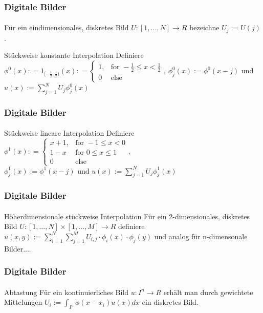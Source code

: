 \documentclass{beamer}
\begin{document}
\begin{frame}
    \frametitle{Digitale Bilder}
\framesubtitle{}
    \begin{block}{}
Für ein eindimensionales, diskretes Bild $U : [1, \ldots, N]  \to R$ bezeichne  $U_{j} := U(j)$.
\end{block}
    \begin{block}{Stückweise konstante Interpolation}
Definiere $\phi^0 (x) : = 1_{ [-\frac{1} {2} ,  \frac{1} {2}) }(x) : =\begin{cases}
   1 , & \text{for } -\frac{1} {2}  \leq x < \frac{1} {2}  \\
    0  & \text{else } 
  \end{cases} $, $\phi^0_j(x):= \phi^0 (x - j)$ und
 $u(x) := \sum_{j=1}^{N} U_j \phi^0_j(x)$ 
\end{block}

 \end{frame}

\begin{frame}
    \frametitle{Digitale Bilder}
\framesubtitle{}

    \begin{block}{Stückweise lineare Interpolation}
Definiere $\phi^1 (x)  : =\begin{cases}
   x + 1 , & \text{for } -1  \leq x < 0  \\
    1 - x  &  \text{for } 0  \leq x \le 1  \\
 0 &  \text{else} 
  \end{cases}, $ \\ 
$\phi^1_j(x):= \phi^1 (x - j)$ und
 $u(x) := \sum_{j=1}^{N} U_j \phi^1_j(x)$ 
\end{block}

 \end{frame}



\begin{frame}
    \frametitle{Digitale Bilder}
\framesubtitle{}
\begin{block}{Höherdimensionale stückweise  Interpolation}
Für ein 2-dimensionales, diskretes Bild $U : [1, \ldots, N] \times   [1, \ldots, M] \to R$ definiere 
 $u(x, y) := \sum_{i=1}^{N} \sum_{j=1}^{M}  U_{i,j} \cdot \phi_i(x) \cdot \phi_j(y)$ und analog für n-dimensonale Bilder....
\end{block}
 \end{frame}


\begin{frame}
    \frametitle{Digitale Bilder}
\framesubtitle{}
\begin{block}{Abtastung}
Für ein kontinuierliches  Bild $u : I^n \to R$ erhält man durch gewichtete Mittelungen
$U_i := \int_{I^n} \phi (x - x_i) u(x) dx$ ein diskretes Bild. 
\end{block}
 \end{frame}
\end{document}
